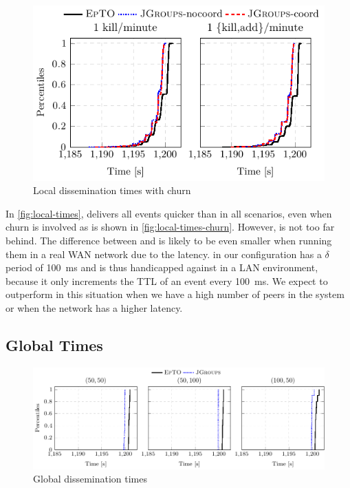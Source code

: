  \begin{figure}[hpt]
 	\centering
 	\includegraphics[width=\linewidth]{figures/local-times-synth-churn.pdf}
 	\vspace{-2mm} 
 	\caption{Local dissemination times with churn}
 	\vspace{-2mm} 
 	\label{fig:local-times-churn} 
 \end{figure}
In \autoref{fig:local-times}, \jgroups delivers all events quicker than \epto in all scenarios, even when churn is involved as is shown in \autoref{fig:local-times-churn}. However, \epto is not too far behind. The difference between \epto and \jgroups is likely to be even smaller when running them in a real WAN network due to the latency. \epto in our configuration has a $\delta$ period of \SI{100}{\milli\second} and is thus handicapped against \jgroups in a LAN environment, because it only increments the TTL of an event every \SI{100}{\milli\second}. We expect \epto to outperform \jgroups in this situation when we have a high number of peers in the system or when the network has a higher latency.
\subsection{Global Times}
 \begin{figure}[hpt]
 	\centering
 	\includegraphics[width=\linewidth]{figures/global-times-nochurn.pdf}
 	\vspace{-2mm} 
 	\caption{Global dissemination times}
 	\vspace{-2mm}
 	\label{fig:global-times}  
 \end{figure}

